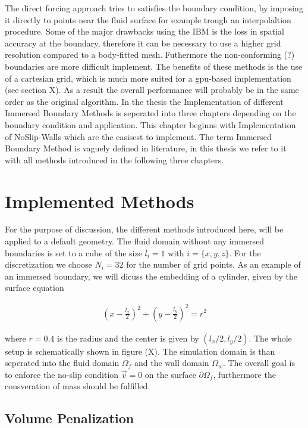 The direct forcing approach tries to satisfies the boundary condition, by imposing it directly to points near the fluid surface for example
trough an interpolaltion procedure.
Some of the major drawbacks using the IBM is the loss in  spatial accuracy at the boundary, therefore it can be necessary to use a higher grid resolution
compared to a body-fitted mesh.  Futhermore the non-conforming (?) boundaries are more difficult implement.
The benefits of these methods is the use of a cartesian grid, which is much more suited for a gpu-based implementation (see section X).
As a result the overall performance will probably be in the same order as the original algorithm.
In the thesis the Implementation of different Immersed Boundary Methods is seperated into three chapters depending on the boundary condition and application.
This chapter beginns with Implementation of NoSlip-Walls which are the easisest to implement.
The term Immersed Boundary Method is vaguely defined in literature, in this thesis we refer to it with all methods introduced in the following three chapters.


\newpage

\section{Implemented Methods}

For the purpose of discussion, the different methods introduced here, will be applied to a default geometry.
The fluid domain without any immersed boundaries is set to a cube of the size $l_i= 1$ with  $i = \{x, y, z\}$.
For the discretization we choose $N_i = 32$ for the number of grid points.
As an example of an immersed boundary, we will dicuss the embedding of a cylinder, given by the  surface equation

\begin{align}
    \left(x - \frac{l_x}{2}\right)^2 + \left(y - \frac{l_y}{2}\right)^2 = r^2
\end{align}

where $r=0.4$ is the radius and the center is given by $(l_x/2, l_y/2)$. The whole setup is schematically shown in figure (X).
The simulation domain is than seperated into the fluid domain $\Omega_f$ and the wall domain $\Omega_w$.
The overall goal is to enforce the no-slip condition $\vec{v} = 0$ on the surface $\partial \Omega_f$, furthermore
the consveration of mass should be fulfilled.

\subsection{Volume Penalization}

